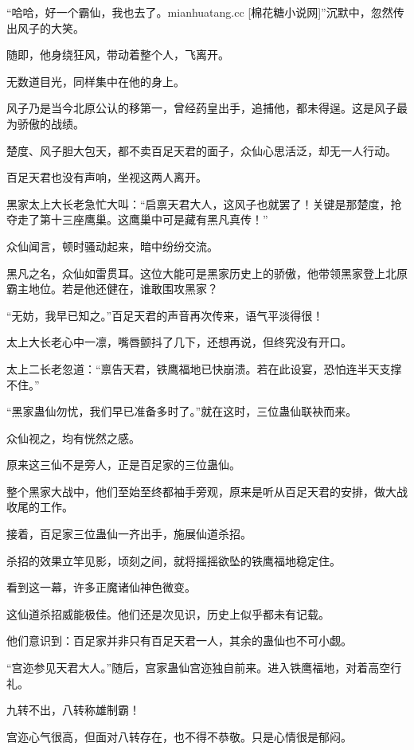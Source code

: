 
\begin{this_body}

“哈哈，好一个霸仙，我也去了。mianhuatang.cc [棉花糖小说网]”沉默中，忽然传出风子的大笑。

随即，他身绕狂风，带动着整个人，飞离开。

无数道目光，同样集中在他的身上。

风子乃是当今北原公认的移第一，曾经药皇出手，追捕他，都未得逞。这是风子最为骄傲的战绩。

楚度、风子胆大包天，都不卖百足天君的面子，众仙心思活泛，却无一人行动。

百足天君也没有声响，坐视这两人离开。

黑家太上大长老急忙大叫：“启禀天君大人，这风子也就罢了！关键是那楚度，抢夺走了第十三座鹰巢。这鹰巢中可是藏有黑凡真传！”

众仙闻言，顿时骚动起来，暗中纷纷交流。

黑凡之名，众仙如雷贯耳。这位大能可是黑家历史上的骄傲，他带领黑家登上北原霸主地位。若是他还健在，谁敢围攻黑家？

“无妨，我早已知之。”百足天君的声音再次传来，语气平淡得很！

太上大长老心中一凛，嘴唇颤抖了几下，还想再说，但终究没有开口。

太上二长老忽道：“禀告天君，铁鹰福地已快崩溃。若在此设宴，恐怕连半天支撑不住。”

“黑家蛊仙勿忧，我们早已准备多时了。”就在这时，三位蛊仙联袂而来。

众仙视之，均有恍然之感。

原来这三仙不是旁人，正是百足家的三位蛊仙。

整个黑家大战中，他们至始至终都袖手旁观，原来是听从百足天君的安排，做大战收尾的工作。

接着，百足家三位蛊仙一齐出手，施展仙道杀招。

杀招的效果立竿见影，顷刻之间，就将摇摇欲坠的铁鹰福地稳定住。

看到这一幕，许多正魔诸仙神色微变。

这仙道杀招威能极佳。他们还是次见识，历史上似乎都未有记载。

他们意识到：百足家并非只有百足天君一人，其余的蛊仙也不可小觑。

“宫迩参见天君大人。”随后，宫家蛊仙宫迩独自前来。进入铁鹰福地，对着高空行礼。

九转不出，八转称雄制霸！

宫迩心气很高，但面对八转存在，也不得不恭敬。只是心情很是郁闷。


\end{this_body}
